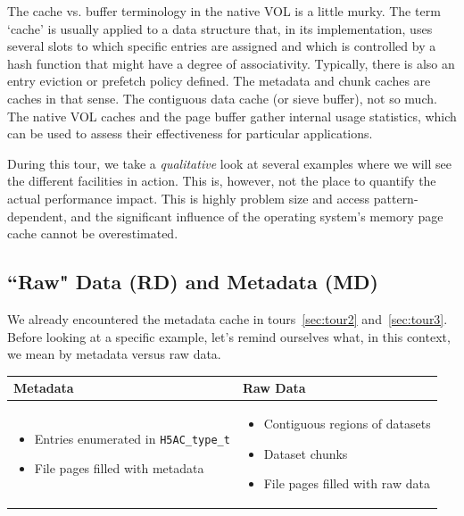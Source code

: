 The cache vs. buffer terminology in the native VOL is a little murky. The term `cache' is usually applied to a data structure that, in its implementation, uses several slots to which specific entries are assigned and which is controlled by a hash function that might have a degree of associativity. Typically, there is also an entry eviction or prefetch policy defined. The metadata and chunk caches are caches in that sense. The contiguous data cache (or sieve buffer), not so much. The native VOL caches and the page buffer gather internal usage statistics, which can be used to assess their effectiveness for particular applications.

During this tour, we take a \textit{qualitative} look at several examples where we will see the different facilities in action. This is, however, not the place to quantify the actual performance impact. This is highly problem size and access pattern-dependent, and the significant influence of the operating system's memory page cache cannot be overestimated.

\subsection{``Raw" Data (RD) and Metadata (MD)}

We already encountered the metadata cache in tours~\ref{sec:tour2} and~\ref{sec:tour3}. Before looking at a specific example, let's remind ourselves what, in this context, we mean by metadata versus raw data.

\begin{center}
\begin{tabular}{ | m{20em} | m{20em} | }
  \hline
  \textbf{Metadata} & \textbf{Raw Data} \\ \hline
  \begin{itemize}
      \item Entries enumerated in \texttt{H5AC\_type\_t}
      \item File pages filled with metadata
  \end{itemize}
  &
  \begin{itemize}
  \item Contiguous regions of datasets
  \item Dataset chunks
  \item File pages filled with raw data
  \end{itemize} \\
  \hline
\end{tabular}
\end{center}

